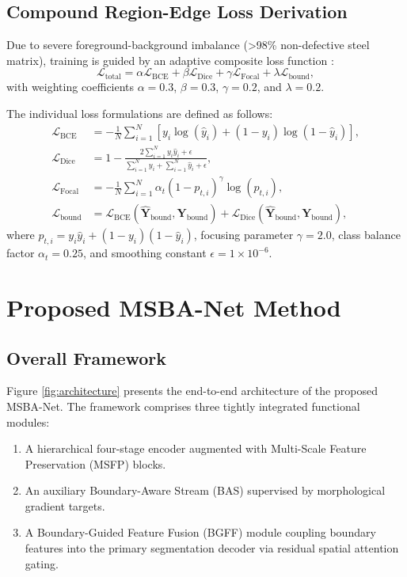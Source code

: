 \documentclass{ieeeaccess}
\begin{document}
\subsection{Compound Region-Edge Loss Derivation}
Due to severe foreground-background imbalance (>98\% non-defective steel matrix), training is guided by an adaptive composite loss function \cite{compositeloss2024}:
\begin{equation}
  \mathcal{L}_{\text{total}} = \alpha \mathcal{L}_{\text{BCE}} + \beta \mathcal{L}_{\text{Dice}} + \gamma \mathcal{L}_{\text{Focal}} + \lambda \mathcal{L}_{\text{bound}},
  \label{eq:loss_total}
\end{equation}
with weighting coefficients $\alpha = 0.3$, $\beta = 0.3$, $\gamma = 0.2$, and $\lambda = 0.2$.

The individual loss formulations are defined as follows:
\begin{align}
  \mathcal{L}_{\text{BCE}} &= -\frac{1}{N}\sum_{i=1}^N \left[ y_i \log(\hat{y}_i) + (1 - y_i)\log(1 - \hat{y}_i) \right], \label{eq:loss_bce} \\
  \mathcal{L}_{\text{Dice}} &= 1 - \frac{2\sum_{i=1}^N y_i \hat{y}_i + \epsilon}{\sum_{i=1}^N y_i + \sum_{i=1}^N \hat{y}_i + \epsilon}, \label{eq:loss_dice} \\
  \mathcal{L}_{\text{Focal}} &= -\frac{1}{N}\sum_{i=1}^N \alpha_t (1 - p_{t, i})^\gamma \log(p_{t, i}), \label{eq:loss_focal} \\
  \mathcal{L}_{\text{bound}} &= \mathcal{L}_{\text{BCE}}(\hat{\mathbf{Y}}_{\text{bound}}, \mathbf{Y}_{\text{bound}}) + \mathcal{L}_{\text{Dice}}(\hat{\mathbf{Y}}_{\text{bound}}, \mathbf{Y}_{\text{bound}}), \label{eq:loss_bound}
\end{align}
where $p_{t, i} = y_i \hat{y}_i + (1 - y_i)(1 - \hat{y}_i)$, focusing parameter $\gamma = 2.0$, class balance factor $\alpha_t = 0.25$, and smoothing constant $\epsilon = 1 \times 10^{-6}$.

\section{Proposed MSBA-Net Method}
\label{sec:proposed_method}

\subsection{Overall Framework}
Figure \ref{fig:architecture} presents the end-to-end architecture of the proposed MSBA-Net. The framework comprises three tightly integrated functional modules:
\begin{enumerate}
    \item A hierarchical four-stage encoder augmented with Multi-Scale Feature Preservation (MSFP) blocks.
    \item An auxiliary Boundary-Aware Stream (BAS) supervised by morphological gradient targets.
    \item A Boundary-Guided Feature Fusion (BGFF) module coupling boundary features into the primary segmentation decoder via residual spatial attention gating.
\end{enumerate}
\end{document}
